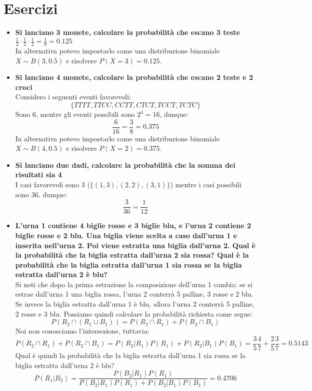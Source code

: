 \documentclass[11pt]{report}
\begin{document}
\section{Esercizi}
\begin{itemize}
	\item \textbf{Si lanciano 3 monete, calcolare la probabilità che escano 3 teste}\\
	$\frac{1}{2} \cdot \frac{1}{2} \cdot \frac{1}{2} = \frac{1}{8} = 0.125$\\
	In alternativa potevo impostarlo come una distribuzione binomiale $X \sim B(3, 0.5)$ e risolvere $P(X=3) = 0.125$.
	\item \textbf{Si lanciano 4 monete, calcolare la probabilità che escano 2 teste e 2 croci}\\
	Considero i seguenti eventi favorevoli:
	$$\{TTTT, TTCC, CCTT, CTCT, TCCT, TCTC\}$$
	Sono 6, mentre gli eventi possibili sono $2^4 = 16$, dunque:
	$$\frac{6}{16} = \frac{3}{8} = 0.375$$
	In alternativa potevo impostarlo come una distribuzione binomiale $X \sim B(4, 0.5)$ e risolvere $P(X=2) = 0.375$.
	\item \textbf{Si lanciano due dadi, calcolare la probabilità che la somma dei risultati sia 4}\\
	I casi favorevoli sono 3 ($\{(1,3), (2,2), (3,1)\}$) mentre i casi possibili sono 36, dunque:
	$$\frac{3}{36} = \frac{1}{12}$$
	\item \textbf{L'urna 1 contiene 4 biglie rosse e 3 biglie blu, e l'urna 2 contiene 2 biglie rosse e 2 blu. Una biglia viene scelta a caso dall'urna 1 e inserita nell'urna 2. Poi viene estratta una biglia dall'urna 2. Qual è la probabilità che la biglia estratta dall'urna 2 sia rossa? Qual è la probabilità che la biglia estratta dall'urna 1 sia rossa se la biglia estratta dall'urna 2 è blu?}\\
	Si noti che dopo la prima estrazione la composizione dell'urna 1 cambia: se si estrae dall'urna 1 una biglia rossa, l'urna 2 conterrà 5 palline, 3 rosse e 2 blu. Se invece la biglia estratta dall'urna 1 è blu, allora l'urna 2 conterrà 5 palline, 2 rosse e 3 blu. Possiamo quindi calcolare la probabilità richiesta come segue:
	$$P(R_2 \cap (R_1 \cup B_1)) = P(R_2 \cap R_1) + P(R_2 \cap B_1)$$
	Noi non conosciamo l'intersezione, tuttavia:
	$$P(R_2 \cap R_1) + P(R_2 \cap B_1) = P(R_2|R_1)P(R_1) + P(R_2|B_1)P(B_1) = \frac{3}{5}\frac{4}{7} + \frac{2}{5}\frac{3}{7} = 0.5143$$
	Qual è quindi la probabilità che la biglia estratta dall'urna 1 sia rossa se la biglia estratta dall'urna 2 è blu?
	$$P(R_1|B_2) = \frac{P(B_2|R_1)P(R_1)}{P(B_2|R_1)P(R_1) + P(B_2|B_1)P(B_1)} = 0.4706$$

\end{itemize}
\end{document}
